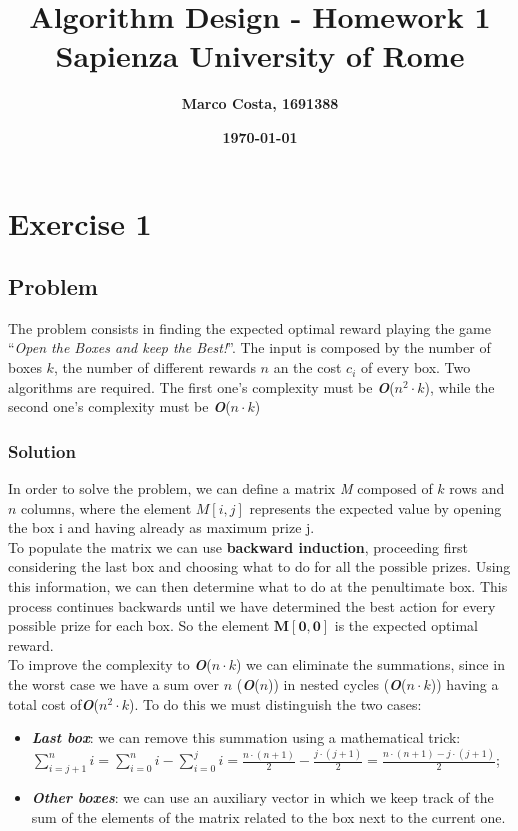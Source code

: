 \documentclass[11pt]{article}
\title{\textbf{Algorithm Design - Homework 1} \\ \bigskip \large \textbf{Sapienza University of Rome}}
\date{\textbf{\today}}
\author{\textbf{Marco Costa, 1691388}}
\begin{document}
\maketitle
\newpage

\section*{Exercise 1}
\subsection*{Problem}
The problem consists in finding the expected optimal reward playing the game ``\textit{Open the Boxes and keep the Best!}''. The input is composed by the number of boxes $k$, the number of different rewards $n$ an
the cost $c_i$ of every box. Two algorithms are required. The first one's complexity must be \textbf{\textit{O}}($n^2 \cdot k$), while the second one's complexity must be \textbf{\textit{O}}($n \cdot k$)
\subsubsection*{Solution}
In order to solve the problem, we can define a matrix \textit{M} composed of $k$ rows and $n$ columns, where the element $M[i, j]$ represents the expected value by opening the box i and having already as maximum prize j. \\
To populate the matrix we can use \textbf{backward induction}, proceeding first considering the last box and choosing what to do for all the possible prizes. Using this information, we can then determine what to do at the penultimate box. This process continues backwards until we have determined the best action for every possible prize for each box. So the element $\mathbf{M[0, 0]}$ is the expected optimal reward.\\
To improve the complexity to \textbf{\textit{O}}($n \cdot k$) we can eliminate the summations, since in the worst case we have a sum over $n$ (\textbf{\textit{O}}($n$)) in nested cycles (\textbf{\textit{O}}($n \cdot k$)) having a total cost of\textbf{\textit{O}}($n^2 \cdot k$). To do this we must distinguish the two cases:
\begin{itemize}
	\item \textbf{\textit{Last box}}: we can remove this summation using a mathematical trick: \\
	$\sum\limits_{i = j + 1}^n{i} = \sum\limits_{i = 0}^n{i} - \sum\limits_{i = 0}^j{i} = \frac{n \cdot (n+1)}{2} - \frac{j \cdot (j+1)}{2} = \frac{n \cdot (n+1) - j \cdot (j+1)}{2}$;
	\item \textbf{\textit{Other boxes}}: we can use an auxiliary vector in which we keep track of the sum of the elements of the matrix related to the box next to the current one.
\end{itemize}
\end{document}
